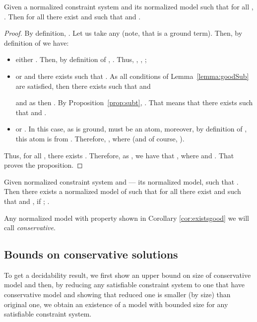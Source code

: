 \begin{prop}\label{prop:mainprop}
 Given a normalized constraint system  
 and its normalized model  such that for all , . 
 Then  for all  there exist  and   such that  
and \br .

\begin{proof}
\raggedright
 By definition, . Let us take any  (note, that  is a ground term). Then, by definition of  we have:
\begin{itemize}
 \item either . Then, by definition of , . Thus, , , ;
 
 \item or  and there exists  such that . 
  As all conditions of Lemma~\ref{lemma:goodSub} are satisfied, then there exists  such that  and 
 
  and as  then .
  By Proposition~\ref{prop:subt}, . 
  That means that there exists   such that  and .
 


 \item or . In this case, as  is ground,  must be an atom, moreover, by definition of , this atom is from . 
	Therefore, , where  (and of course, ).
\end{itemize}

Thus,  for all , there exists . 
Therefore, as  , we have that , where    and .  That proves the proposition.
\end{proof}

\end{prop}



\begin{cor}\label{cor:existsgood}
	 Given normalized constraint system  and  --- its normalized model,   such that . Then there exists a normalized model  of   such that for all  there exist  and  such that  and , if ; .


\end{cor}
 Any normalized model with property shown in Corollary \ref{cor:existsgood} we will call \emph{conservative}.

\subsection{Bounds on conservative solutions}
\label{subs:bounds}

To get a decidability result, 
we first show an upper bound on size of conservative model 
and then, 
by reducing any satisfiable constraint system to one that have 
conservative model and showing that reduced one is smaller
(by size) than original one,
we obtain an existence of a model with bounded size for any 
satisfiable constraint system.


